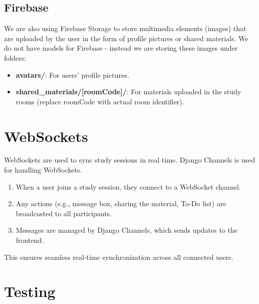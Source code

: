 \documentclass[a4paper,12pt]{article}
\begin{document}
\subsection{Firebase}



We are also using Firebase Storage to store multimedia elements (images) that are uploaded by the user in the form of profile pictures or shared materials. We do not have models for Firebase - instead we are storing these images under folders:



\begin{itemize}

    \item \textbf{avatars/}: For users' profile pictures.

    \item \textbf{shared\_materials/[roomCode]/}: For materials uploaded in the study rooms (replace roomCode with actual room identifier).

\end{itemize}



\section{WebSockets}

WebSockets are used to sync study sessions in real time. Django Channels is used for handling WebSockets.



\begin{enumerate}

    \item When a user joins a study session, they connect to a WebSocket channel.

    \item Any actions (e.g., message box, sharing the material, To-Do list) are broadcasted to all participants.

    \item Messages are managed by Django Channels, which sends updates to the frontend.

\end{enumerate}



This ensures seamless real-time synchronization across all connected users.





\section{Testing}
\end{document}
